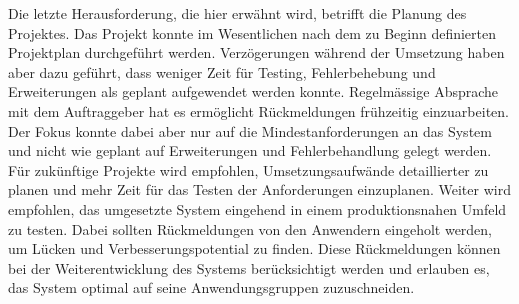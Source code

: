 Die letzte Herausforderung, die hier erwähnt wird, betrifft die Planung des Projektes.
Das Projekt konnte im Wesentlichen nach dem zu Beginn definierten Projektplan durchgeführt werden.
Verzögerungen während der Umsetzung haben aber dazu geführt, dass weniger Zeit für Testing, Fehlerbehebung und Erweiterungen als geplant aufgewendet werden konnte.
Regelmässige Absprache mit dem Auftraggeber hat es ermöglicht Rückmeldungen frühzeitig einzuarbeiten.
Der Fokus konnte dabei aber nur auf die Mindestanforderungen an das System und nicht wie geplant auf Erweiterungen und Fehlerbehandlung gelegt werden.
Für zukünftige Projekte wird empfohlen, Umsetzungsaufwände detaillierter zu planen und mehr Zeit für das Testen der Anforderungen einzuplanen.
Weiter wird empfohlen, das umgesetzte System eingehend in einem produktionsnahen Umfeld zu testen.
Dabei sollten Rückmeldungen von den Anwendern eingeholt werden, um Lücken und Verbesserungspotential zu finden.
Diese Rückmeldungen können bei der Weiterentwicklung des Systems berücksichtigt werden und erlauben es, das System optimal auf seine Anwendungsgruppen zuzuschneiden.

\clearpage
